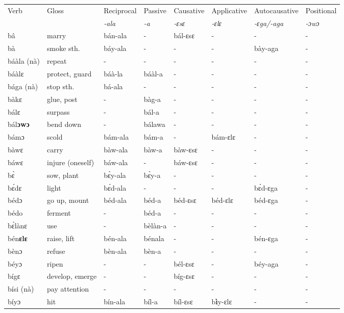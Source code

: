 \begin{sidewaystable}

\begin{tabular}{llllllll}
 \lsptoprule
 Verb & Gloss & Reciprocal & Passive  & Causative  & Applicative   & Autocausative & Positional   \\ 
  &    & {\itshape -ala} & {\itshape -a} & {\itshape -ɛsɛ} & {\itshape -ɛlɛ} & {\itshape -ɛga/-aga}  & {\itshape -ɔwɔ}  \\
\midrule
bâ & marry & bán-ala & - & bál-ɛsɛ & - & - & -  \\
bà & smoke sth. & báy-ala & - & - & - & bày-aga & -  \\
báàla (nà) & repeat & - & - & - & - & - & - \\
báàlɛ & protect, guard & báà-la & báàl-a & - & - & - & - \\
bága (nà) & stop sth. & bá-ala & - & - & - & - & -  \\
bàkɛ & glue, post & - & bàg-a & - & - & - & - \\
bálɛ & surpass & - & bál-a & - & - & - & -  \\
bál{\bfseries ɔwɔ} & bend down & - & bálawa & - & - & - & -  \\
bámɔ & scold & bám-ala & bám-a & - & bám-ɛlɛ & - & -  \\
bàwɛ & carry & bàw-ala & bàw-a & bàw-ɛsɛ & - & - & -  \\
báwɛ & injure (oneself) & báw-ala & - & báw-ɛsɛ & - & - & -  \\  
bɛ̀ & sow, plant & bɛ̀y-ala & bɛ̀y-a & - & - & - & -  \\
bɛ́dɛ & light & bɛ́d-ala & - & - & -  & bɛ́d-ɛga & -  \\
bédɔ & go up, mount & béd-ala & béd-a & béd-ɛsɛ & béd-ɛlɛ &  béd-ɛga & - \\
bédo & ferment & - &  béd-a & - & - & - & - \\
bɛ̀lànɛ & use & - & bèlàn-a & - & - & - & - \\
bén{\bfseries ɛlɛ} & raise, lift & bén-ala & bénala & - & -  & bén-ɛga & - \\
bènɔ & refuse & bèn-ala & bèn-a & - & - & - & - \\
béyɔ & ripen & - & - & bél-ɛsɛ & - & béy-aga & - \\
bígɛ & develop, emerge & - & - & bíg-ɛsɛ & - & - & - \\
bísi (nà) & pay attention & - & - & - & - & - & - \\
bíyɔ & hit & bín-ala & bíl-a & bíl-ɛsɛ &  b{\bfseries ì}y-ɛlɛ &  - & - \\
\midrule\end{tabular}\end{sidewaystable}

